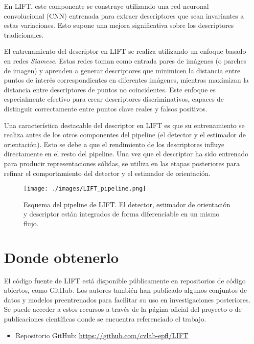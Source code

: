 \documentclass{article}
\begin{document}
En LIFT, este componente se construye utilizando una red neuronal convolucional (CNN) entrenada para extraer descriptores que sean invariantes a estas variaciones. Esto supone una mejora significativa sobre los descriptores tradicionales.

El entrenamiento del descriptor en LIFT se realiza utilizando un enfoque basado en redes \textit{Siamese}. Estas redes toman como entrada pares de imágenes (o parches de imagen) y aprenden a generar descriptores que minimicen la distancia entre puntos de interés correspondientes en diferentes imágenes, mientras maximizan la distancia entre descriptores de puntos no coincidentes. Este enfoque es especialmente efectivo para crear descriptores discriminativos, capaces de distinguir correctamente entre puntos clave reales y falsos positivos.

Una característica destacable del descriptor en LIFT es que su entrenamiento se realiza antes de los otros componentes del pipeline (el detector y el estimador de orientación). Esto se debe a que el rendimiento de los descriptores influye directamente en el resto del pipeline. Una vez que el descriptor ha sido entrenado para producir representaciones sólidas, se utiliza en las etapas posteriores para refinar el comportamiento del detector y el estimador de orientación.

\begin{figure}[!ht]
  \centering
  \texttt{[image: ./images/LIFT\_pipeline.png]}
  \caption{Esquema del pipeline de LIFT. El detector, estimador de orientación y descriptor están integrados de forma diferenciable en un mismo flujo.}
  \label{fig:liftpipe}
\end{figure}

\section{Donde obtenerlo}

El código fuente de LIFT está disponible públicamente en repositorios de código abiertos, como GitHub. Los autores también han publicado algunos conjuntos de datos y modelos preentrenados para facilitar su uso en investigaciones posteriores. Se puede acceder a estos recursos a través de la página oficial del proyecto o de publicaciones científicas donde se encuentra referenciado el trabajo.

\begin{itemize}
  \item Repositorio GitHub: \url{https://github.com/cvlab-epfl/LIFT}
\end{itemize}
\end{document}
